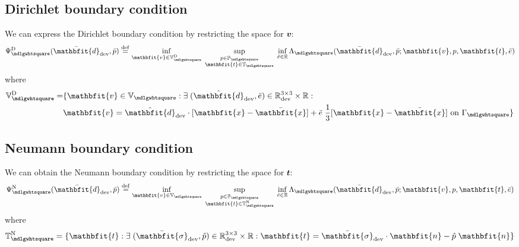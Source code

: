 \documentclass[notitlepage,a4paper,fleqn,9pt]{extarticle}
\renewcommand{\ta}[1]{\mathbfit{#1}}
\renewcommand{\ts}[1]{\mathbfit{#1}}
\renewcommand{\Box}{\mdlgwhtsquare}
\begin{document}
\begin{multicols}{2}
\subsection{Dirichlet boundary condition}
We can express the Dirichlet boundary condition by restricting the space for $\ta v$:
\begin{align}
\label{eq:dirichlet_potential}
 \Psi^\Dirichlet_\Box(\bar{\ts d}_\dev, \bar{p} ) \defeq
    \inf_{\ta v \in \set V_\Box^\Dirichlet } \;
    \sup_{\substack{ p\in \set P_\Box \\ \ta t \in \set{T}_\Box }} \;
    \inf_{\bar{e} \in \set{R}}
    \Lambda_\Box(\bar{\ts d}_\dev, \bar{p}; \ta v, p, \ta t, \bar{e})
\end{align}
where
\begin{align}
 \set{V}_\Box^\Dirichlet =& \{ \ta v \in \set{V}_\Box : \exists\; (\hat{\ts d}_\dev,\bar{e}) \in \set{R}^{3\times 3}_\dev \times \set{R} :
\nonumber\\
  & \ta v = \hat{\ts d}_\dev\cdot[\ta x - \bar{\ta x}] + \bar{e}\;\frac13 [\ta x - \bar{\ta x}] \text{ on }\Gamma_\Box \}
\end{align}

\subsection{Neumann boundary condition}
We can obtain the Neumann boundary condition by restricting the space for $\ta t$:
\begin{align}
 \Psi^\Neumann_\Box(\bar{\ts d}_\dev, \bar{p} ) \defeq
    \inf_{\ta v \in \set V_\Box } \;
    \sup_{\substack{p\in \set P_\Box \\ \ta t \in \set T_\Box^\Neumann }} \;
    \inf_{\bar{e} \in \set{R} }
    \Lambda_\Box(\bar{\ts d}_\dev, \bar p; \ta v, p, \ta t, \bar{e})
\end{align}
where
\begin{align}
 \set T_\Box^\Neumann = \{ \ta t : \exists\; (\bar{\ts\sigma}_\dev, \hat{p}) \in \set{R}^{3\times 3}_\dev \times \set{R} : \ta t = \bar{\ts\sigma}_\dev\cdot\ta n - \hat{p}\;\ta n \}
\end{align}






\end{multicols}
\end{document}
